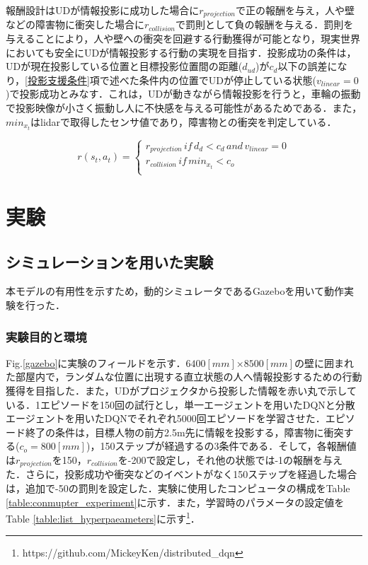 \documentclass[12pt]{sonota/aislab}
\begin{document}
報酬設計はUDが情報投影に成功した場合に$r_{projection}$で正の報酬を与え，人や壁などの障害物に衝突した場合に$r_{collision}$で罰則として負の報酬を与える．罰則を与えることにより，人や壁への衝突を回避する行動獲得が可能となり，現実世界においても安全にUDが情報投影する行動の実現を目指す．投影成功の条件は，UDが現在投影している位置と目標投影位置間の距離($d_{ud}$)が$c_{d}$以下の誤差になり，\ref{投影支援条件}項で述べた条件内の位置でUDが停止している状態($v_{linear}=0$)で投影成功とみなす．これは，UDが動きながら情報投影を行うと，車輪の振動で投影映像が小さく振動し人に不快感を与える可能性があるためである．また，$min_{x_t}$はlidarで取得したセンサ値であり，障害物との衝突を判定している．

\begin{equation}
r(s_{t},a_{t})= \left \{
\begin{array}{l}
r_{projection}\,if\,d_{d}<c_{d}\,and\,v_{linear}=0 \\
r_{collision}\,if\,min_{x_{t}} < c_{o} \\
\end{array}
\right.
\end{equation}


\chapter{実験}
\section{シミュレーションを用いた実験}
本モデルの有用性を示すため，動的シミュレータであるGazeboを用いて動作実験を行った．

\subsection{実験目的と環境}
Fig.\ref{gazebo}に実験のフィールドを示す．$6400[mm]$×$8500[mm]$の壁に囲まれた部屋内で，ランダムな位置に出現する直立状態の人へ情報投影するための行動獲得を目指した．また，UDがプロジェクタから投影した情報を赤い丸で示している．1エピソードを150回の試行とし，単一エージェントを用いたDQNと分散エージェントを用いたDQNでそれぞれ5000回エピソードを学習させた．エピソード終了の条件は，目標人物の前方2.5m先に情報を投影する，障害物に衝突する($c_{o}=800[mm]$)，150ステップが経過するの3条件である．そして，各報酬値は$r_{projection}$を150，$r_{collision}$を-200で設定し，それ他の状態では-1の報酬を与えた．さらに，投影成功や衝突などのイベントがなく150ステップを経過した場合は，追加で-50の罰則を設定した．実験に使用したコンピュータの構成をTable \ref{table:conmupter_experiment}に示す．また，学習時のパラメータの設定値をTable \ref{table:list_hyperpaeameters}に示す\footnote{https://github.com/MickeyKen/distributed\_dqn}．
\end{document}
